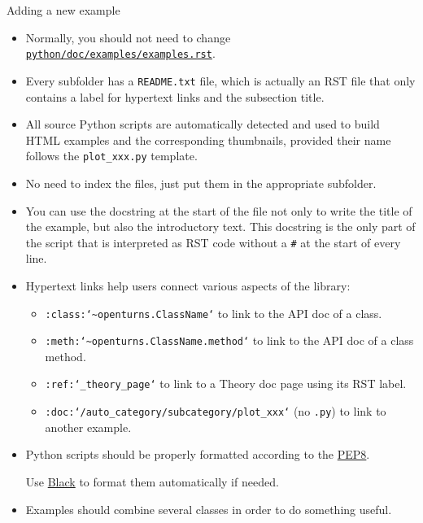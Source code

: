 \documentclass[8pt]{beamer}
\begin{document}
\begin{frame}{Adding a new example}
\begin{itemize}
    \item Normally, you should not need to change \href{https://github.com/openturns/openturns/blob/master/python/doc/examples/examples.rst}{\texttt{python/doc/examples/examples.rst}}.
    \item Every subfolder has a \alert{\texttt{README.txt}} file, which is actually an RST file that only contains a label for hypertext links and the subsection title.
    \item All source Python scripts are \alert{automatically detected} and used to build HTML examples and the corresponding thumbnails, provided their name follows the \texttt{plot\_xxx.py} template.
    \item \alert{No need to index the files}, just put them in the appropriate subfolder.
    \item You can use the \alert{docstring} at the start of the file not only to write the title of the example, but also the introductory text. This docstring is the only part of the script that is interpreted as RST code without a \alert{\texttt{\#}} at the start of every line.
    \item \alert{Hypertext links} help users connect various aspects of the library:
    \begin{itemize}
        \item \texttt{:class:`\textasciitilde openturns.ClassName`} to link to the API doc of a class.
        \item \texttt{:meth:`\textasciitilde openturns.ClassName.method`} to link to the API doc of a class method.
        \item \texttt{:ref:`\_theory\_page`} to link to a Theory doc page using its RST label.
        \item \texttt{:doc:`/auto\_category/subcategory/plot\_xxx`} (no \texttt{.py}) to link to another example.
    \end{itemize}
    \item Python scripts should be properly
    formatted according to the \href{https://www.python.org/dev/peps/pep-0008/}{\alert{PEP8}}.

    Use \href{https://github.com/psf/black}{\alert{Black}} to format them automatically if needed.
    \item  Examples should \alert{combine several classes} in order to \alert{do something useful}.
\end{itemize}
\end{frame}
\end{document}
